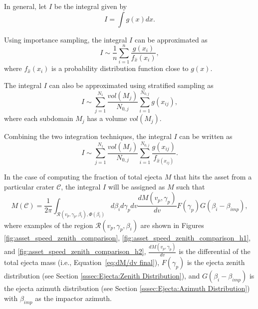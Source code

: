 \documentclass{article}
\begin{document}
In general, let $I$ be the integral given by
\begin{equation}
I = \int g(x)dx.
\end{equation}

Using importance sampling, the integral $I$ can be approximated as
\begin{equation}
I \sim \frac{1}{n}\sum_{i=1}^{n}\frac{g(x_i)}{f_{\hat{x}}(x_i)},
\end{equation}
where $f_{\hat{x}}(x_i)$ is a probability distribution function close to $g(x)$.

The integral $I$ can also be approximated using stratified sampling as
\begin{equation}
I \sim \sum_{j=1}^{N_1}\frac{vol(M_j)}{N_{0,j}}\sum_{i=1}^{N_{0,j}}g(x_{ij}),
\end{equation}
where each subdomain $M_j$ has a volume $vol(M_j)$.

Combining the two integration techniques, the integral $I$ can be written as
\begin{equation}
I \sim \sum_{j=1}^{N_1}\frac{vol(M_j)}{N_{0,j}}\sum_{i=1}^{N_{0,j}}\frac{g(x_{ij})}{f_{\hat{x}(x_{ij})}}.
\end{equation}


In the case of computing the fraction of total ejecta $M$ that hits the asset from a particular crater $\mathcal{C}$, the integral $I$ will be assigned as $M$ such that
\begin{equation}
M(\mathcal{C}) = \frac{1}{2\pi}\int_{\mathcal{R}(v_p,\gamma_p, \beta_i), \Phi(\beta_i)} d\beta_i d\gamma_p dv \frac{dM(v_p,\gamma_p)}{dv} F(\gamma_p) G(\beta_i-\beta_{imp}),
\end{equation}
where examples of the region $\mathcal{R}(v_p,\gamma_p, \beta_i)$ are shown in Figures \ref{fig:asset_speed_zenith_comparison}, \ref{fig:asset_speed_zenith_comparison_h1}, and \ref{fig:asset_speed_zenith_comparison_h2}, $\frac{dM(v_p,\gamma_p)}{dv}$ is the differential of the total ejecta mass (i.e., Equation~\eqref{eq:dM/dv final}), $F(\gamma_p)$ is the ejecta zenith distribution (see Section \ref{sssec:Ejecta:Zenith Distribution}), and $G(\beta_i-\beta_{imp})$ is the ejecta azimuth distribution (see Section \ref{sssec:Ejecta:Azimuth Distribution}) with $\beta_{imp}$ as the impactor azimuth.
\end{document}
